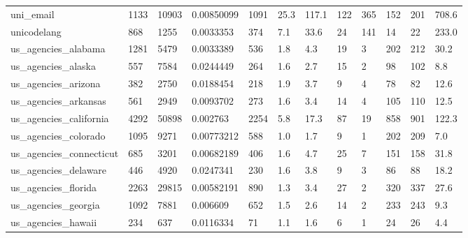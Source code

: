 \begin{longtable}{llllllllllll}
 uni\_email                                          & 1133       & 10903     & 0.00850099  & 1091  & 25.3   & 117.1  & 122   & 365    & 152    & 201    & 708.6   \\
 unicodelang                                        & 868        & 1255      & 0.0033353   & 374   & 7.1    & 33.6   & 24    & 141    & 14     & 22     & 233.0   \\
 us\_agencies\_alabama                                & 1281       & 5479      & 0.0033389   & 536   & 1.8    & 4.3    & 19    & 3      & 202    & 212    & 30.2    \\
 us\_agencies\_alaska                                 & 557        & 7584      & 0.0244449   & 264   & 1.6    & 2.7    & 15    & 2      & 98     & 102    & 8.8     \\
 us\_agencies\_arizona                                & 382        & 2750      & 0.0188454   & 218   & 1.9    & 3.7    & 9     & 4      & 78     & 82     & 12.6    \\
 us\_agencies\_arkansas                               & 561        & 2949      & 0.0093702   & 273   & 1.6    & 3.4    & 14    & 4      & 105    & 110    & 12.5    \\
 us\_agencies\_california                             & 4292       & 50898     & 0.002763    & 2254  & 5.8    & 17.3   & 87    & 19     & 858    & 901    & 122.3   \\
 us\_agencies\_colorado                               & 1095       & 9271      & 0.00773212  & 588   & 1.0    & 1.7    & 9     & 1      & 202    & 209    & 7.0     \\
 us\_agencies\_connecticut                            & 685        & 3201      & 0.00682189  & 406   & 1.6    & 4.7    & 25    & 7      & 151    & 158    & 31.8    \\
 us\_agencies\_delaware                               & 446        & 4920      & 0.0247341   & 230   & 1.6    & 3.8    & 9     & 3      & 86     & 88     & 18.2    \\
 us\_agencies\_florida                                & 2263       & 29815     & 0.00582191  & 890   & 1.3    & 3.4    & 27    & 2      & 320    & 337    & 27.6    \\
 us\_agencies\_georgia                                & 1092       & 7881      & 0.006609    & 652   & 1.5    & 2.6    & 14    & 2      & 233    & 243    & 9.3     \\
 us\_agencies\_hawaii                                 & 234        & 637       & 0.0116334   & 71    & 1.1    & 1.6    & 6     & 1      & 24     & 26     & 4.4     \\

\end{longtable}
